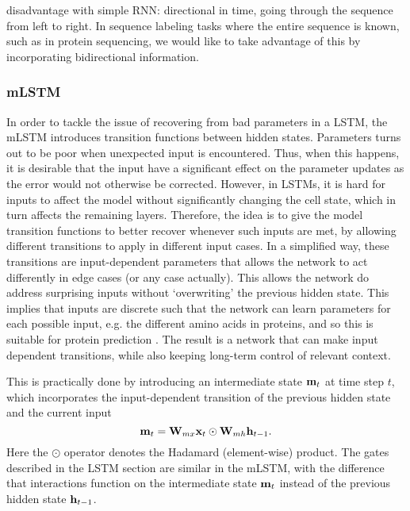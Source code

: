 \documentclass[a4paper,12pt]{article}
\begin{document}

 disadvantage with simple RNN: directional in time, going through the sequence from left to right. In sequence labeling tasks where the entire sequence is known, such as in protein sequencing, we would like to take advantage of this by incorporating bidirectional information.

\subsubsection{mLSTM}
In order to tackle the issue of recovering from bad parameters in a LSTM, the mLSTM introduces transition functions between hidden states. Parameters turns out to be poor when unexpected input is encountered. Thus, when this happens, it is desirable that the input have a significant effect on the parameter updates as the error would not otherwise be corrected. However, in LSTMs, it is hard for inputs to affect the model without significantly changing the cell state, which in turn affects the remaining layers. Therefore, the idea is to give the model transition functions to better recover whenever such inputs are met, by allowing different transitions to apply in different input cases. In a simplified way, these transitions are input-dependent parameters that allows the network to act differently in edge cases (or any case actually). This allows the network do address surprising inputs without `overwriting' the previous hidden state. This implies that inputs are discrete such that the network can learn parameters for each possible input, e.g. the different amino acids in proteins, and so this is suitable for protein prediction \cite{krause2016multiplicative}. The result is a network that can make input dependent transitions, while also keeping long-term control of relevant context.

This is practically done by introducing an intermediate state $\mathbf{ m }_t$ at time step $t$, which incorporates the input-dependent transition of the previous hidden state and the current input
\[ \mathbf{ m }_t = \mathbf{ W }_{mx} \mathbf{ x }_t \odot \mathbf{ W }_{mh} \mathbf{ h }_{t-1}. \]
Here the $\odot$ operator denotes the Hadamard (element-wise) product. The gates described in the LSTM section are similar in the mLSTM, with the difference that interactions function on the intermediate state $\mathbf{ m }_t$ instead of the previous hidden state $\mathbf{ h }_{t-1}$. 
\end{document}
